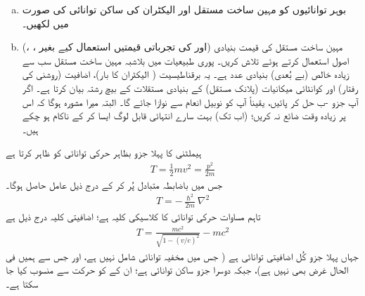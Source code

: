 \begin{enumerate}[a.]
\item
بوہر توانائیوں کو مہین ساخت مستقل اور الیکٹران کی ساکن توانائی  کی صورت میں لکھیں۔
\item
(، ،  اور  کی تجرباتی قیمتیں استعمال کیے بغیر) مہین ساخت مستقل کی قیمت بنیادی اصول استعمال کرتے ہوئے تلاش کریں۔ پوری طبیعیات میں بلاشبہ مہین ساخت مستقل سب سے زیادہ خالص (بے بُعدی) بنیادی عدد ہے۔ یہ برقناطیسیت ( الیکٹران کا بار)، اضافیت (روشنی کی رفتار) اور کوانٹائی میکانیات (پلانک مستقل) کے بنیادی مستقلات کے بیچ رشتہ بیان کرتا ہے۔ اگر آپ جزو -ب حل کر پائیں، یقیناً آپ کو نوبیل انعام سے نوازا جائے گا۔ البتہ میرا مشورہ ہوگا کہ اس پر زیادہ وقت ضائع نہ کریں؛ (اب تک) بہت سارے انتہائی قابل لوگ ایسا کر کے ناکام ہو چکے ہیں۔ 
\end{enumerate}

ہیملٹنی کا پہلا جزو بظاہر حرکی توانائی کو ظاہر کرتا ہے 
\begin{align}\label{مساوات_غیر_مضطرب_حرکی_توانائی}
T = \frac{1}{2} mv^2 = \frac{p^2}{2m} 
\end{align}
جس میں باضابطہ متبادل  پُر کر کے درج ذیل عامل حاصل ہوگا۔
\begin{align}
T = - \frac{\hslash^2}{2m} \nabla^2
\end{align} 
تاہم مساوات  حرکی توانائی کا کلاسیکی کلیہ ہے؛ اضافیتی کلیہ درج ذیل ہے
\begin{align}
T = \frac{mc^2}{\sqrt{1 - (v/c)^2}} - mc^2
\end{align}
جہاں پہلا جزو کُل اضافیتی توانائی ہے ( جس میں مخفیہ توانائی شامل نہیں ہے، اور جس سے ہمیں فی الحال غرض بھی نہیں ہے)، جبکہ دوسرا جزو ساکن توانائی ہے؛ ان کے کو حرکت سے منسوب کیا جا سکتا ہے۔

